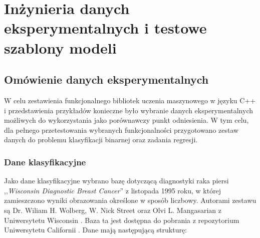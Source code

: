 \chapter{Inżynieria danych eksperymentalnych i testowe szablony modeli}
\section{Omówienie danych eksperymentalnych}

W celu zestawienia funkcjonalnego bibliotek uczenia maszynowego w języku C++ i przedstawienia przykładów konieczne było wybranie danych eksperymentalnych możliwych do wykorzystania jako porównawczy punkt odniesienia. W tym celu, dla pełnego przetestowania wybranych funkcjonalności przygotowano zestaw danych do problemu klasyfikacji binarnej oraz zadania regresji.

\subsection{Dane klasyfikacyjne}
	
	 Jako dane klasyfikacyjne wybrano bazę dotyczącą diagnostyki raka piersi ,,\textit{Wisconsin Diagnostic Breast Cancer}'' z listopada 1995 roku, w której zamieszczono wyniki obrazowania określone w sposób liczbowy. Autorami zestawu są Dr. Wiliam H. Wolberg, W. Nick Street oraz Olvi L. Mangasarian z Uniwersytetu Wisconsin \cite{wisconsin}. Baza ta jest dostępna do pobrania z repozytorium Uniwersytetu Californii \cite{Dua:2019}. Dane mają następującą strukturę:
	
